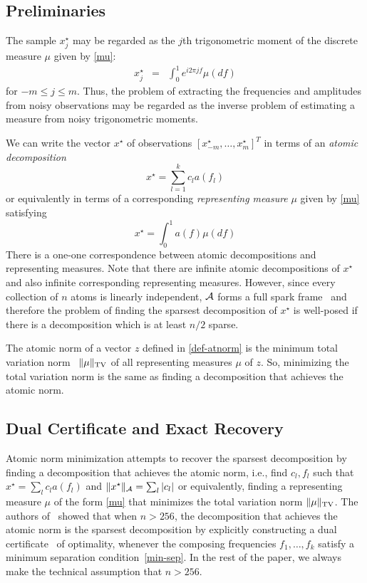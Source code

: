 \subsection{Preliminaries}
The sample $x^\star_j$ may be regarded as the $j$th trigonometric moment of 
the discrete measure $\mu$ given by \eqref{mu}:
\begin{eqnarray*}
  x_j^\star & = & \int_0^1 e^{i 2 \pi j f} \mu ( d f)
\end{eqnarray*}
for $-m \leq j \leq m$.
Thus, the problem of extracting the frequencies and amplitudes from noisy 
observations may be regarded as the inverse problem of estimating a measure 
from noisy trigonometric moments.

We can write the vector $x^\star$ of observations $[x_{-m}^\star, \ldots, x_m^\star]^T$ in terms of an \emph{atomic decomposition}
\[
x^\star = \sum_{l=1}^k c_l a(f_l)
\]
or equivalently in terms of a corresponding \emph{representing measure} $\mu$ given by \eqref{mu} satisfying
\[
x^\star = \int_0^1 a(f) \mu(df)
\]
There is a one-one correspondence between atomic decompositions and representing measures. Note that there are infinite atomic decompositions of $x^\star$ and also infinite corresponding representing measures. However, since every collection of $n$ atoms is linearly independent, $\mathcal{A}$ forms a full spark frame~\cite{spark} and therefore the problem of finding the sparsest decomposition of $x^\star$ is well-posed if there is a decomposition which is at least $n/2$ sparse.

The atomic norm of a vector $z$ defined in \eqref{def-atnorm} is the minimum total variation norm~\cite{cs_otg,tvnorm} $\lVert\mu\rVert_{\mathrm{TV}}$ of all representing measures $\mu$ of $z$. So, minimizing the total variation norm is the same as finding a decomposition that achieves the atomic norm.

\subsection{Dual Certificate and Exact Recovery}

Atomic norm minimization attempts to recover the sparsest  decomposition by finding a decomposition that achieves the atomic norm, i.e., find ${c_l,f_l}$ such that  $x^\star = \sum_l c_l a(f_l)$ and $
\lVert x^\star\rVert_{\mathcal{A}} = \sum_l |c_l| 
$ or equivalently, finding a representing measure $\mu$ of the form \eqref{mu} that minimizes the total variation norm $
\lVert\mu\rVert_{\mathrm{TV}}$. The authors  of~\cite{cg_exact12} showed 
that when $n > 256$, the  decomposition that achieves the atomic norm is the sparsest decomposition 
by explicitly constructing a dual certificate~\cite{dualcert} of optimality, whenever the composing 
frequencies $f_1, \ldots, f_k$ satisfy a minimum separation condition~\eqref{min-sep}. In the rest of the paper, we always make the technical assumption that $n > 256$.


